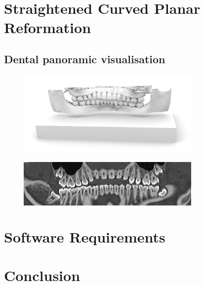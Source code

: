 \documentclass{InsightArticle}
\begin{document}
\section{Straightened Curved Planar Reformation}
%
\cite{KAN01}
%
\subsection{Dental panoramic visualisation}
\begin{figure}
\centering
\includegraphics[width=0.8\textwidth]{Images/pano_blender.png}
\end{figure}
%
\begin{figure}
\centering
\includegraphics[width=0.8\textwidth]{Images/pano_paraview.png}
\end{figure}
%
\subsection{}

%
\section{Software Requirements}
%
\section{Conclusion}
%
%
\appendix

%
%



\end{document}
